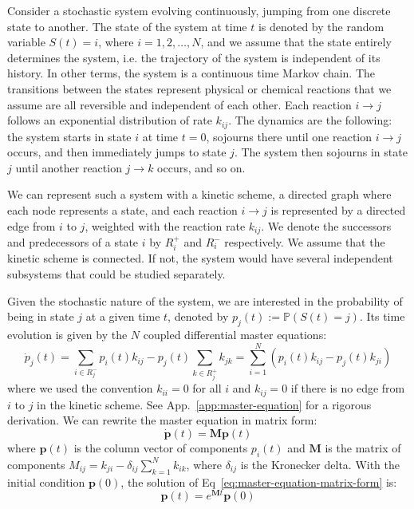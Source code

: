 Consider a stochastic system evolving continuously, jumping from one discrete state to another. The state of the system at time $t$ is denoted by the random variable $S(t)=i$, where $i=1,2,\dots,N$, and we assume that the state entirely determines the system, i.e. the trajectory of the system is independent of its history. In other terms, the system is a continuous time Markov chain.
The transitions between the states represent physical or chemical reactions that we assume are all reversible and independent of each other. Each reaction $i\to j$ follows an exponential distribution of rate $k_{ij}$.
The dynamics are the following: the system starts in state $i$ at time $t=0$, sojourns there until one reaction $i\to j$ occurs, and then immediately jumps to state $j$. The system then sojourns in state $j$ until another reaction $j\to k$ occurs, and so on. 

We can represent such a system with a kinetic scheme, a directed graph where each node represents a state, and each reaction $i\to j$ is represented by a directed edge from $i$ to $j$, weighted with the reaction rate $k_{ij}$. We denote the successors and predecessors of a state $i$ by $R_i^+$ and $R_i^-$ respectively. 
We assume that the kinetic scheme is connected. If not, the system would have several independent subsystems that could be studied separately. 

Given the stochastic nature of the system, we are interested in the probability of being in state $j$ at a given time $t$, denoted by $p_j(t):=\mathbb{P}(S(t)=j)$. Its time evolution is given by the $N$ coupled differential master equations:
\begin{equation}
\label{eq:master-equation-kinetic-scheme}
    \dot{p}_j(t) = \sum_{i\in R_j^-}p_i(t)k_{ij} - p_j(t)\sum_{k\in R_j^+}k_{jk} = \sum_{i=1}^N \left(p_i(t)k_{ij} - p_j(t)k_{ji}\right)
\end{equation}
where we used the convention $k_{ii}=0$ for all $i$ and $k_{ij}=0$ if there is no edge from $i$ to $j$ in the kinetic scheme. See App.~\ref{app:master-equation} for a rigorous derivation.
We can rewrite the master equation in matrix form:
\begin{equation}
\label{eq:master-equation-matrix-form}
    \dot{\mathbf{p}}(t) = \mathbf{M}\mathbf{p}(t)
\end{equation}
where $\mathbf{p}(t)$ is the column vector of components $p_i(t)$ and $\mathbf{M}$ is the matrix of components $M_{ij}=k_{ji} - \delta_{ij}\sum_{k=1}^N k_{ik}$, where $\delta_{ij}$ is the Kronecker delta.
With the initial condition $\mathbf{p}(0)$, the solution of Eq~\eqref{eq:master-equation-matrix-form} is:
\begin{equation}
    \mathbf{p}(t) = e^{\mathbf{M}t}\mathbf{p}(0)
\end{equation}

